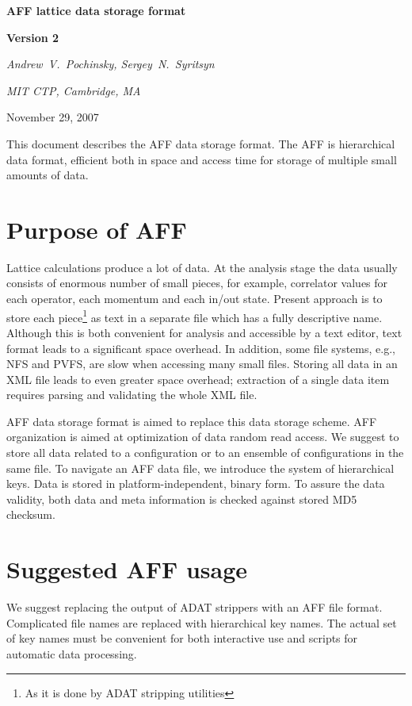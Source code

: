 \documentclass[10pt,letterpaper]{article}
\begin{document}
\centerline{\huge\bf AFF lattice data storage format}
\vspace{15pt}
\centerline{\huge\bf Version 2}
\vspace{20pt}
\centerline{\it Andrew~V.~Pochinsky, Sergey~N.~Syritsyn}
\centerline{\it MIT CTP, Cambridge, MA}
\vspace{10pt}
\centerline{November 29, 2007}
\vspace{20pt}

\noindent This document describes the AFF data storage format. 
The AFF is hierarchical data format, efficient both in space and access time 
for storage of multiple small amounts of data.

\newpage
\tableofcontents
\newpage

\section{Purpose of AFF}
Lattice calculations produce a lot of data. 
At the analysis stage the data usually consists of enormous number of small
pieces, for example, correlator values for
each operator, each momentum and each in/out state.
Present approach is to store each
piece\footnote{As it is done by ADAT stripping utilities}
as text in a separate file which has a fully descriptive name. 
Although this is both convenient for analysis and accessible by a text editor,
text format leads to a significant space overhead. 
In addition, some file systems, e.g., NFS and PVFS, are slow when accessing
many small files. 
Storing all data in an XML file leads to even greater space overhead;
extraction of a single data item requires parsing and validating the
whole XML file.

AFF data storage format is aimed to replace this data storage scheme. 
AFF organization is aimed at optimization of data random read access.
We suggest to store all data related to a configuration or to an ensemble of configurations in
the same file.
To navigate an AFF data file, we introduce the system of hierarchical keys.
Data is stored in platform-independent, binary form.
To assure the data validity, both data and meta information is checked against stored
MD5 checksum.


\section{Suggested AFF usage}

We suggest replacing the output of ADAT strippers with an AFF file format. 
Complicated file names are replaced with hierarchical key names. 
The actual set of key names must be convenient for both interactive use and 
scripts for automatic data processing.
\end{document}
